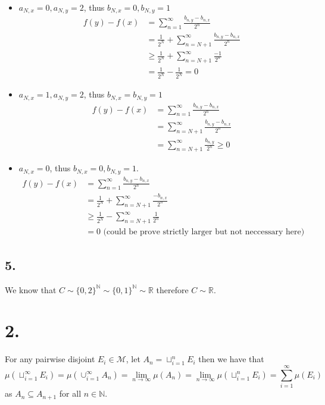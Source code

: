 \documentclass[11pt]{article}
\theoremstyle{mystyle}
\theoremstyle{definition}
\begin{document}
\begin{itemize}
  \item $a_{N,x} = 0, a_{N,y} = 2$, thus $b_{N,x} = 0 , b_{N,y} = 1$ 
    \begin{align*}
      f(y) - f(x) 
      &= \sum_{n=1}^\infty \frac{b_{n,y} - b_{n,x}}{2^n} \\
      &= \frac{1}{2^N}+\sum_{n=N+1}^\infty \frac{b_{n,y} - b_{n,x}}{2^n} \\
      &\ge \frac{1}{2^N} + \sum_{n=N+1}^\infty \frac{-1}{2^n} \\
      &= \frac{1}{2^N} - \frac{1}{2^N} = 0  
    \end{align*}
  \item $a_{N,x} = 1, a_{N,y} = 2$, thus $b_{N,x} = b_{N,y} = 1$ 
    \begin{align*}
      f(y) - f(x) 
      &= \sum_{n=1}^\infty \frac{b_{n,y} - b_{n,x}}{2^n} \\
      &= \sum_{n=N+1}^\infty \frac{b_{n,y} - b_{n,x}}{2^n} \\
      &= \sum_{n=N+1}^\infty \frac{b_{n,y}}{2^n} \ge 0
    \end{align*}
  \item $a_{N,x} = 0$, thus $b_{N,x} = 0, b_{N,y} = 1$. 
    \begin{align*}
      f(y) - f(x) 
      &= \sum_{n=1}^\infty \frac{b_{n,y} - b_{n,x}}{2^n} \\
      &= \frac{1}{2^N}+\sum_{n=N+1}^\infty \frac{- b_{n,x}}{2^n} \\
      &\ge \frac{1}{2^N} - \sum_{n=N+1}^\infty \frac{1}{2^n} \\
      &= 0 \text{ (could be prove strictly larger but not neccessary here)}
    \end{align*}
\end{itemize}
\subsection*{5.}
We know that $C \sim \{0,2\}^\mathbb{N} \sim \{0,1\}^\mathbb{N} \sim \mathbb{R}$ therefore $C \sim \mathbb{R}$. 
\newpage
\section*{2.}
For any pairwise disjoint $E_i \in \mathcal{M}$, let $A_n = \sqcup_{i=1}^n E_i$ then we have that 
\[
  \mu(\sqcup_{i=1}^\infty E_i) = \mu(\cup_{i=1}^\infty A_n) = \lim_{n \to \infty}\mu(A_n) = \lim_{n \to \infty} \mu(\sqcup_{i=1}^n E_i) = \sum_{i=1}^\infty \mu(E_i) 
\]
as $A_n \subseteq A_{n+1}$ for all $n \in \mathbb{N}$. 
\newpage
\end{document}
